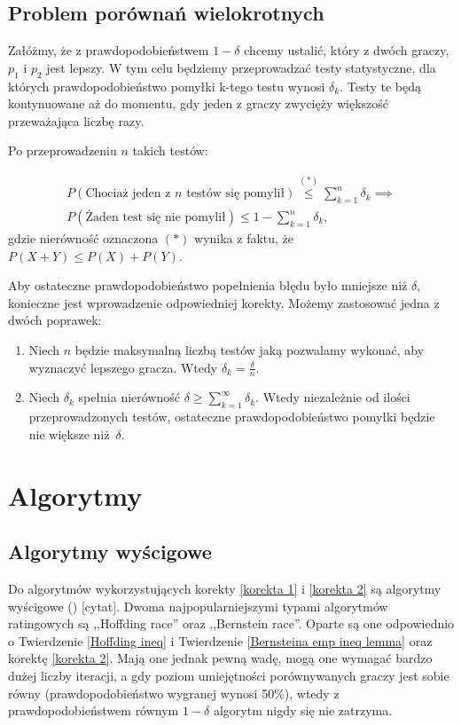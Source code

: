 \documentclass[inzynierska]{pwr_wmat_praca_dyplomowa}
\theoremstyle{plain}
\numberwithin{theorem}{chapter}
\theoremstyle{definition}
\numberwithin{theorem}{chapter}
\begin{document}
	\section{Problem porównań wielokrotnych}
	Załóżmy, że z prawdopodobieństwem $1-\delta$ chcemy ustalić, który z dwóch graczy, $p_1$ i $p_2$ jest lepszy. W tym
	celu będziemy przeprowadzać testy statystyczne, dla których
	prawdopodobieństwo pomyłki k-tego testu wynosi $\delta_k$. Testy te będą kontynuowane aż do momentu, gdy jeden z graczy zwycięży większość przeważająca liczbę razy. 
	
	Po przeprowadzeniu $n$ takich testów:

	\begin{gather*}
		P(\text{Chociaż jeden z $n$ testów się pomylił}) \overset{(*)}{\le} \sum_{k=1}^n \delta_k \implies  \\
	P(\text{Żaden test się nie pomylił}) \le 1 - \sum_{k=1}^n \delta_k,
	\end{gather*} 
	gdzie nierówność oznaczona $(*)$ wynika z faktu, że $P(X+Y) \le P(X) + P(Y)$.
	
	Aby ostateczne prawdopodobieństwo popełnienia błędu było mniejsze niż $\delta$, konieczne jest wprowadzenie odpowiedniej korekty.
	Możemy zastosować jedna z dwóch poprawek:

	\begin{enumerate}[label=\thesection.\arabic*]
		\item \label{korekta 1} Niech $n$ będzie maksymalną liczbą testów jaką pozwalamy wykonać, aby wyznaczyć lepszego
		gracza. Wtedy $\delta_k=\frac{\delta}{n}$.
		\item \label{korekta 2} Niech $\delta_k$ spełnia nierówność $ \delta \ge \sum_{k = 1}^{\infty}\delta_k$. Wtedy niezależnie od
		ilości przeprowadzonych testów, ostateczne
		prawdopodobieństwo pomyłki będzie nie większe niż~$\delta$.
	\end{enumerate}

	\chapter{Algorytmy}
	\section{Algorytmy wyścigowe}
	Do algorytmów wykorzystujących korekty \ref{korekta 1} i \ref{korekta 2} są algorytmy wyścigowe
	() [cytat]. Dwoma najpopularniejszymi typami algorytmów ratingowych są ,,Hoffding race'' oraz ,,Bernstein race''.
	Oparte są one odpowiednio o Twierdzenie \ref{Hoffding ineq} i Twierdzenie \ref{Bernsteina emp ineq lemma} oraz korektę \ref{korekta 2}. Mają one jednak pewną wadę, mogą one wymagać bardzo dużej liczby iteracji, a gdy poziom umiejętności porównywanych graczy jest sobie równy (prawdopodobieństwo wygranej wynosi 50\%), wtedy z prawdopodobieństwem równym $1-\delta$ algorytm nigdy się nie zatrzyma.
	
\end{document}
